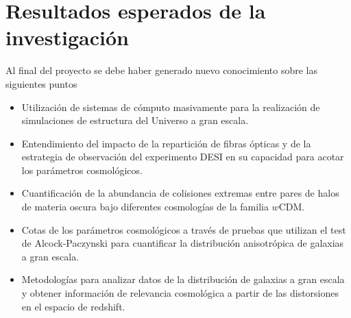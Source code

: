 
\section{Resultados esperados de la investigaci\'on}

Al final del proyecto se debe haber generado nuevo conocimiento sobre las siguientes puntos

\begin{itemize}
\item Utilizaci\'on de sistemas de c\'omputo masivamente para la
  realizaci\'on de simulaciones de estructura del Universo a gran
  escala.
\item Entendimiento del impacto de la repartici\'on de fibras
  \'opticas y de la estrategia de observaci\'on del experimento DESI
en su capacidad para acotar los par\'ametros cosmol\'ogicos.
\item Cuantificaci\'on de la abundancia de colisiones extremas entre
  pares de halos de materia oscura bajo diferentes cosmolog\'ias de la
  familia $w$CDM.
\item Cotas de los par\'ametros cosmol\'ogicos a trav\'es de pruebas
  que utilizan el test de Alcock-Paczynski para cuantificar la
  distribuci\'on anisotr\'opica de galaxias a gran escala.
\item Metodolog\'ias para analizar datos de la distribuci\'on de
  galaxias a gran escala y obtener informaci\'on de relevancia
  cosmol\'ogica a partir de las distorsiones en el espacio de
  redshift.
\end{itemize}

